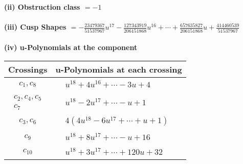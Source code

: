\documentclass[1p]{elsarticle_modified}
\theoremstyle{definition}
\begin{document}
\flushleft \textbf{(ii) Obstruction class $= -1$}\\~\\
\flushleft \textbf{(iii) Cusp Shapes $= -\frac{23479367}{51537967} u^{17}-\frac{127343919}{206151868} u^{16}+\cdots+\frac{657635827}{206151868} u+\frac{414460539}{51537967}$}\\~\\
\newpage\renewcommand{\arraystretch}{1}
\flushleft \textbf{(iv) u-Polynomials at the component}\newline \\
\begin{tabular}{m{50pt}|m{274pt}}
Crossings & \hspace{64pt}u-Polynomials at each crossing \\
\hline $$\begin{aligned}c_{1},c_{8}\end{aligned}$$&$\begin{aligned}
&u^{18}+4 u^{16}+\cdots-3 u+4
\end{aligned}$\\
\hline $$\begin{aligned}c_{2},c_{4},c_{5}\\c_{7}\end{aligned}$$&$\begin{aligned}
&u^{18}-2 u^{17}+\cdots- u+1
\end{aligned}$\\
\hline $$\begin{aligned}c_{3},c_{6}\end{aligned}$$&$\begin{aligned}
&4(4 u^{18}-6 u^{17}+\cdots+u+1)
\end{aligned}$\\
\hline $$\begin{aligned}c_{9}\end{aligned}$$&$\begin{aligned}
&u^{18}+8 u^{17}+\cdots- u+16
\end{aligned}$\\
\hline $$\begin{aligned}c_{10}\end{aligned}$$&$\begin{aligned}
&u^{18}+3 u^{17}+\cdots+120 u+32
\end{aligned}$\\
\hline
\end{tabular}\\~\\
\newpage\renewcommand{\arraystretch}{1}
\end{document}
